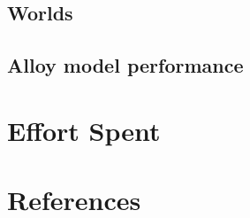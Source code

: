   \section{Worlds}
  
  \section{Alloy model performance}
  

  \chapter{Effort Spent}
  
  

  \chapter{References}
  
  
  

  \setupspellchecking[state=start]